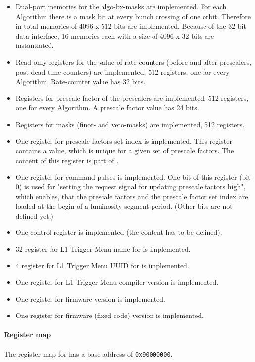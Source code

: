 \begin {itemize}
\item Dual-port memories for the algo-bx-masks are implemented. For each Algorithm there is a mask bit at every bunch crossing of one orbit. Therefore in total memories of 4096 x 512 bits
are implemented. Because of the 32 bit data interface, 16 memories each with a size of 4096 x 32 bits are instantiated.
\item Read-only registers for the value of rate-counters (before and after prescalers, post-dead-time counters) are implemented, 512 registers, one for every Algorithm. Rate-counter value has 32 bits.
\item Registers for prescale factor of the prescalers are implemented, 512 registers, one for every Algorithm. A prescale factor value has 24 bits.
\item Registers for masks (finor- and veto-masks) are implemented, 512 registers.
\item One register for prescale factors set index is implemented. This register contains a value, which is unique for a given set of prescale factors. The content of this register is
part of \record.
\item One register for command pulses is implemented. One bit of this register (bit 0) is used for "setting the request signal for updating prescale factors high", which enables, that the prescale factors and the prescale factor set index
are loaded at the begin of a luminosity segment period. (Other bits are not defined yet.)
\item One control register is implemented (the content has to be defined).
\item 32 register for L1 Trigger Menu name for \ugtl is implemented.
\item 4 register for L1 Trigger Menu UUID for \ugtl is implemented.
\item One register for L1 Trigger Menu compiler version is implemented.
\item One register for \ufdl firmware version is implemented.
\item One register for \ugtl firmware (fixed code) version is implemented.
\end {itemize}

\paragraph{Register map}
\label{sec:fdl:reg_map}
The register map for \ufdl has a base address of \verb|0x90000000|.


